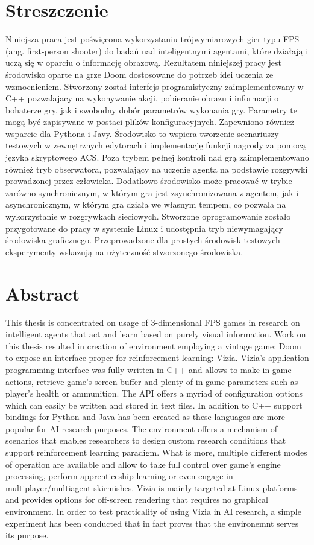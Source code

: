 \chapter*{Streszczenie}
Niniejsza praca jest poświęcona wykorzystaniu trójwymiarowych gier typu FPS (ang. first-person shooter) do badań nad inteligentnymi agentami, które działają i uczą się w oparciu o informację obrazową.
Rezultatem niniejszej pracy jest środowisko oparte na grze Doom dostosowane do potrzeb idei uczenia ze wzmocnieniem.
Stworzony został interfejs programistyczny zaimplementowany w C++ pozwalajacy na wykonywanie akcji, pobieranie obrazu i informacji o bohaterze gry, jak i swobodny dobór parametrów wykonania gry.
Parametry te mogą być zapisywane w postaci plików konfiguracyjnych.
Zapewniono również wsparcie dla Pythona i Javy.
Środowisko to wspiera tworzenie scenariuszy testowych w zewnętrznych edytorach i implementację funkcji nagrody za pomocą języka skryptowego ACS.
Poza trybem pełnej kontroli nad grą zaimplementowano również tryb obserwatora, pozwalający na uczenie agenta na podstawie rozgrywki prowadzonej przez człowieka.
Dodatkowo środowisko może pracować w trybie zarówno synchronicznym, w którym gra jest zsynchronizowana z agentem, jak i asynchronicznym, w którym gra działa we własnym tempem, co pozwala na wykorzystanie w rozgrywkach sieciowych.
Stworzone oprogramowanie zostało przygotowane do pracy w systemie Linux i udostępnia tryb niewymagający środowiska graficznego.
Przeprowadzone dla prostych środowisk testowych eksperymenty wskazują na użyteczność stworzonego środowiska.


\chapter*{Abstract}
This thesis is concentrated on usage of 3-dimensional FPS games in research on intelligent agents that act and learn based on purely visual information. Work on this thesis resulted in creation of environment employing a vintage game: Doom to expose an interface proper for reinforcement learning: Vizia. Vizia's application programming interface was fully written in C++ and allows to make in-game actions, retrieve game's screen buffer and plenty of in-game parameters such as player's health or ammunition. The API offers a myriad of configuration options which can easily be written and stored in text files. In addition to C++ support bindings for Python and Java has been created as these languages are more popular for AI research purposes. The environment offers a mechanism of scenarios that enables researchers to design custom research conditions that support reinforcement learning paradigm. What is more, multiple different modes of operation are available and allow to take full control over game's engine processing, perform apprenticeship learning or even engage in multiplayer/multiagent skirmishes. Vizia is mainly targeted at Linux platforms and provides options for off-screen rendering that requires no graphical environment. In order to test practicality of using Vizia in AI research, a simple experiment has been conducted that in fact proves that the environemnt serves its purpose.
